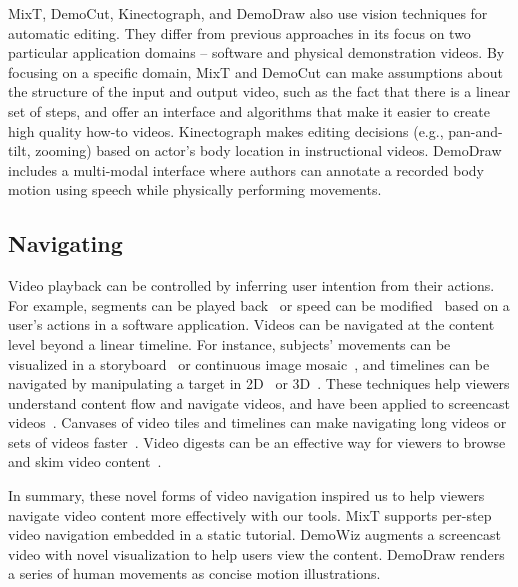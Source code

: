 MixT, DemoCut, Kinectograph, and DemoDraw also use vision techniques for automatic editing. They differ from previous approaches in its focus on two particular application domains -- software and physical demonstration videos.
%
By focusing on a specific domain, MixT and DemoCut can make assumptions about the structure of the input and output video, such as the fact that there is a linear set of steps, and offer an interface and algorithms that make it easier to create high quality how-to videos.
%
Kinectograph makes editing decisions (e.g., pan-and-tilt, zooming) based on actor's body location in instructional videos.
%
DemoDraw includes a multi-modal interface where authors can annotate a recorded body motion using speech while physically performing movements.



\subsection{Navigating}
Video playback can be controlled by inferring user intention from their actions.  For example, segments can be played back~\cite{Pongnumkul:2011ju} or speed can be modified~\cite{Cheng:2009:SUV:1518701.1518823} based on a user's actions in a software application.
%
Videos can be navigated at the content level beyond a linear timeline. For instance, subjects' movements can be visualized in a storyboard~\cite{goldman2006schematic} or continuous image mosaic~\cite{Teodosio:2005:SS:1047936.1047940}, and timelines can be navigated by manipulating a target in 2D~\cite{Dragicevic:2008:VBD:1357054.1357096,Goldman:2008:VOA:1449715.1449719,Karrer:2008:DDM:1357054.1357097} or 3D~\cite{Nguyen:2013:DMV:2470654.2466150}.
%
These techniques help viewers understand content flow and navigate videos, and have been applied to screencast videos~\cite{Denoue:2013:RDM:2451176.2451190,Nguyen:2015:MST:2702123.2702209}.
%
Canvases of video tiles and timelines can make navigating long videos or sets of videos faster~\cite{Al-Hajri:2014:VPH:2611105.2557106}. Video digests can be an effective way for viewers to browse and skim video content~\cite{Pavel:2014:VDB:2642918.2647400}.

In summary, these novel forms of video navigation inspired us to help viewers navigate video content more effectively with our tools.
%
MixT supports per-step video navigation embedded in a static tutorial.
%
DemoWiz augments a screencast video with novel visualization to help users view the content.
%
DemoDraw renders a series of human movements as concise motion illustrations.

